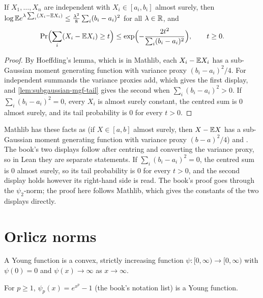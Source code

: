 \begin{theorem}
  \label{thm:han-2-18}
  If $X_1,\dots,X_n$ are independent with $X_i\in[a_i,b_i]$ almost surely, then $\log\mathbb{E} e^{\lambda\sum_i(X_i-\mathbb{E} X_i)}\le\frac{\lambda^2}8\sum_i(b_i-a_i)^2$ for all $\lambda\in\mathbb{R}$, and
  \[
    \Pr\Bigl(\sum_i(X_i-\mathbb{E} X_i)\ge t\Bigr)\le\exp\Bigl(-\frac{2t^2}{\sum_i(b_i-a_i)^2}\Bigr),\qquad t\ge0.
  \]
\end{theorem}
\begin{proof}
  By Hoeffding's lemma, which is in Mathlib, each $X_i-\mathbb{E} X_i$ has a sub-Gaussian moment generating function with variance proxy $(b_i-a_i)^2/4$. For independent summands the variance proxies add, which gives the first display, and \cref{lem:subgaussian-mgf-tail} gives the second when $\sum_i(b_i-a_i)^2>0$. If $\sum_i(b_i-a_i)^2=0$, every $X_i$ is almost surely constant, the centred sum is $0$ almost surely, and its tail probability is $0$ for every $t>0$.
\end{proof}
\begin{remark}
  Mathlib has these facts as  (if $X\in[a,b]$ almost surely, then $X-\mathbb{E} X$ has a sub-Gaussian moment generating function with variance proxy $(b-a)^2/4$) and . The book's two displays follow after centring and converting the variance proxy, so in Lean they are separate statements. If $\sum_i(b_i-a_i)^2=0$, the centred sum is $0$ almost surely, so its tail probability is $0$ for every $t>0$, and the second display holds however its right-hand side is read. The book's proof goes through the $\psi_2$-norm; the proof here follows Mathlib, which gives the constants of the two displays directly.
\end{remark}

\section{Orlicz norms}

\begin{definition}
  \label{def:han-2-9}
  A Young function is a convex, strictly increasing function $\psi:[0,\infty)\to[0,\infty)$ with $\psi(0)=0$ and $\psi(x)\to\infty$ as $x\to\infty$.
\end{definition}
\begin{remark}
  For $p\ge1$, $\psi_p(x)=e^{x^p}-1$ (the book's notation list) is a Young function.
\end{remark}

